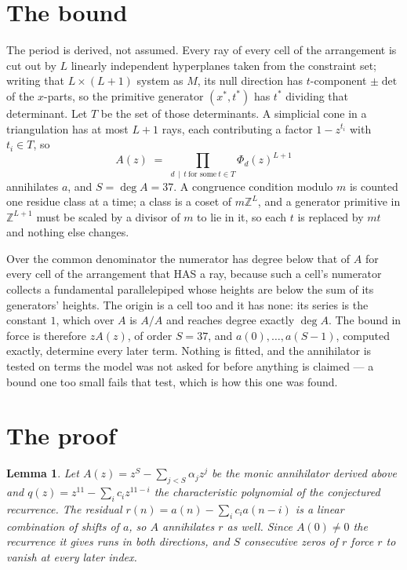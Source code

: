 \documentclass[11pt,a4paper]{article}
\theoremstyle{plain}
\newtheorem{lemma}[theorem]{Lemma}
\theoremstyle{definition}
\begin{document}
\section{The bound}

The period is derived, not assumed. Every ray of every cell of the arrangement is cut out by
$L$ linearly independent hyperplanes taken from the constraint set; writing that $L\times(L+1)$
system as $M$, its null direction has $t$-component $\pm\det$ of the $x$-parts, so the
primitive generator $(x^*,t^*)$ has $t^*$ dividing that determinant. Let $T$ be the set of
those determinants. A simplicial cone in a triangulation has at most $L+1$ rays, each
contributing a factor $1-z^{t_i}$ with $t_i\in T$, so
\[
A(z)\;=\;\prod_{d\,\mid\,t\ \text{for some}\ t\in T}\Phi_d(z)^{L+1}
\]
annihilates $a$, and $S=\deg A=37$. A congruence condition modulo $m$ is counted one residue
class at a time; a class is a coset of $m\mathbb{Z}^L$, and a generator primitive in
$\mathbb{Z}^{L+1}$ must be scaled by a divisor of $m$ to lie in it, so each $t$ is replaced
by $mt$ and nothing else changes.

Over the common denominator the numerator has degree below that of $A$ for every cell of the
arrangement that HAS a ray, because such a cell's numerator collects a fundamental
parallelepiped whose heights are below the sum of its generators' heights. The origin is a cell
too and it has none: its series is the constant $1$, which over $A$ is $A/A$ and reaches degree
exactly $\deg A$. The bound in force is therefore $zA(z)$, of order $S=37$, and
$a(0),\dots,a(S-1)$, computed exactly, determine every later term. Nothing is fitted, and the
annihilator is tested on terms the model was not asked for before anything is claimed --- a
bound one too small fails that test, which is how this one was found.

\section{The proof}

\begin{lemma}\label{lem:crit}
Let $A(z)=z^S-\sum_{j<S}\alpha_jz^{j}$ be the monic annihilator derived above and
$q(z)=z^{11}-\sum_ic_iz^{11-i}$ the characteristic polynomial of the conjectured
recurrence. The residual $r(n)=a(n)-\sum_ic_ia(n-i)$ is a linear combination of shifts of $a$,
so $A$ annihilates $r$ as well. Since $A(0)\ne0$ the recurrence it gives runs in both
directions, and $S$ consecutive zeros of $r$ force $r$ to vanish at every later index.
\end{lemma}
\end{document}
